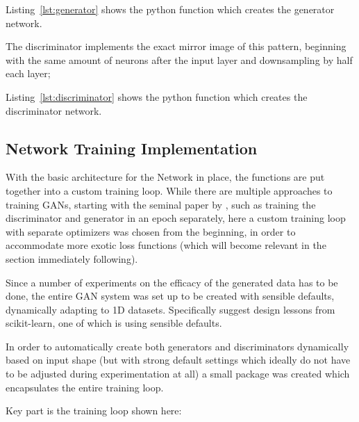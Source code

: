 
Listing~\ref{lst:generator} shows the python function which creates the generator network.

\pagebreak 

The discriminator implements the exact mirror image of this pattern, beginning with the same amount of neurons after the input layer and downsampling by half each layer; 


Listing~\ref{lst:discriminator} shows the python function which creates the discriminator network.

\pagebreak 

\subsection{Network Training Implementation}
\label{subsection:training_loop}

With the basic architecture for the Network in place, the functions are put together into a custom training loop. While there are multiple approaches to training \acp{GAN}, starting with the seminal paper by \cite{goodfellow2014generative}, such as training the discriminator and generator in an epoch separately, here a custom training loop with separate optimizers was chosen from the beginning, in order to accommodate more exotic loss functions (which will become relevant in the section immediately following).

Since a number of experiments on the efficacy of the generated data has to be done, the entire \ac{GAN} system was set up to be created with sensible defaults, dynamically adapting to 1D datasets. 
Specifically \cite{buitinck2013api} suggest design lessons from scikit-learn, one of which is using sensible defaults.

In order to automatically create both generators and discriminators dynamically based on input shape (but with strong default settings which ideally do not have to be adjusted during experimentation at all) a small package was created which encapsulates the entire training loop.

Key part is the training loop shown here:

\newpage



